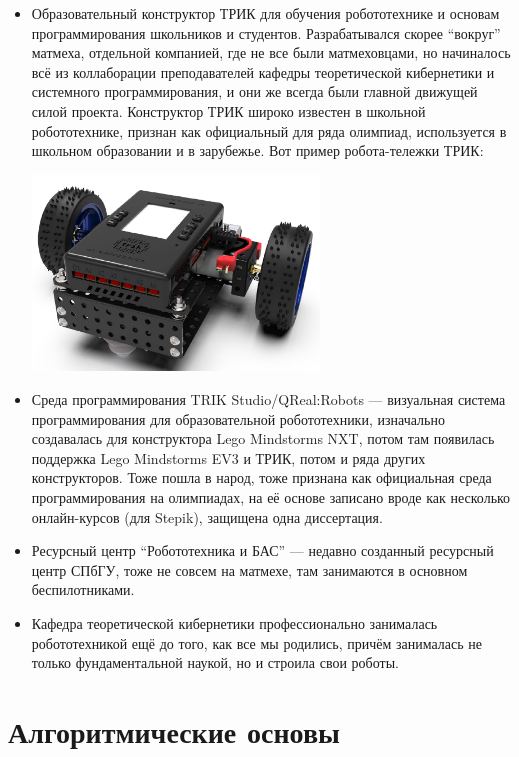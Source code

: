 \documentclass{../../text-style}
\begin{document}
\begin{itemize}
    \item Образовательный конструктор ТРИК для обучения робототехнике и основам программирования школьников и студентов.
    Разрабатывался скорее \enquote{вокруг} матмеха, отдельной компанией, где не все были матмеховцами, но начиналось всё из коллаборации преподавателей кафедры теоретической кибернетики и системного программирования, и они же всегда были главной движущей силой проекта.
    Конструктор ТРИК широко известен в школьной робототехнике, признан как официальный для ряда олимпиад, используется в школьном образовании и в зарубежье.
    Вот пример робота-тележки ТРИК:
        \begin{center}
            \includegraphics[width=0.6\textwidth]{trik.png}
        \end{center}
    \item Среда программирования TRIK Studio/QReal:Robots --- визуальная система программирования для образовательной робототехники, изначально создавалась для конструктора Lego Mindstorms NXT, потом там появилась поддержка Lego Mindstorms EV3 и ТРИК, потом и ряда других конструкторов.
    Тоже пошла в народ, тоже признана как официальная среда программирования на олимпиадах, на её основе записано вроде как несколько онлайн-курсов (для Stepik), защищена одна диссертация.
    \item Ресурсный центр \enquote{Робототехника и БАС} --- недавно созданный ресурсный центр СПбГУ, тоже не совсем на матмехе, там занимаются в основном беспилотниками.
    \item Кафедра теоретической кибернетики профессионально занималась робототехникой ещё до того, как все мы родились, причём занималась не только фундаментальной наукой, но и строила свои роботы.
\end{itemize}

\section{Алгоритмические основы}
\end{document}
